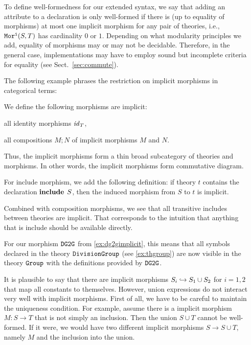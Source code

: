 To define well-formedness for our extended syntax, we say that adding an attribute to a declaration is only well-formed if there is (up to equality of morphisms) at most one implicit morphism for any pair of theories, i.e., $\mathtt{Mor^i}(S,T)$ has cardinality $0$ or $1$.
Depending on what modularity principles we add, equality of morphisms may or may not be decidable.
Therefore, in the general case, implementations may have to employ sound but incomplete criteria for equality (see Sect.~\ref{sec:commute}).

The following example phrases the restriction on implicit morphisms in categorical terms:

\begin{example}\label{impl:cat}
We define the following morphisms are implicit:
\begin{compactitem}
 \item all identity morphisms $\mathit{id}_{T}$,
 \item all compositions $M;N$ of implicit morphisms $M$ and $N$.
\end{compactitem}

Thus, the implicit morphisms form a thin broad subcategory of theories and morphisms.
In other words, the implicit morphisms form commutative diagram.
\end{example}

\begin{example}\label{impl:incl}
For include morphism, we add the following definition: if theory $t$ contains the declaration $\operatorname{\mathbf{include}}{\;S}$, then the induced morphism from $S$ to $t$ is implicit.

Combined with composition morphisms, we see that all transitive includes between theories are implicit.
That corresponds to the intuition that anything that is include should be available directly.
\end{example}

\begin{example}
	For our morphism $\operatorname{\mathtt{DG2G}}$ from \autoref{ex:dg2gimplicit}, this means that all symbols declared in the theory $\operatorname{\mathtt{DivisionGroup}}$ (see \autoref{ex:thgroup}) are now visible in the theory $\operatorname{\mathtt{Group}}$ with the definitions provided by $\operatorname{\mathtt{DG2G}}$.
\end{example}


It is plausible to say that there are implicit morphisms $S_i\hookrightarrow S_1\cup S_2$ for $i=1,2$ that map all constants to themselves.
However, union expressions do not interact very well with implicit morphisms.
First of all, we have to be careful to maintain the uniqueness condition.
For example, assume there is a implicit morphism $M:S\to T$ that is not simply an inclusion.
Then the union $S\cup T$ cannot be well-formed.
If it were, we would have two different implicit morphisms $S\to S\cup T$, namely $M$ and the inclusion into the union.

